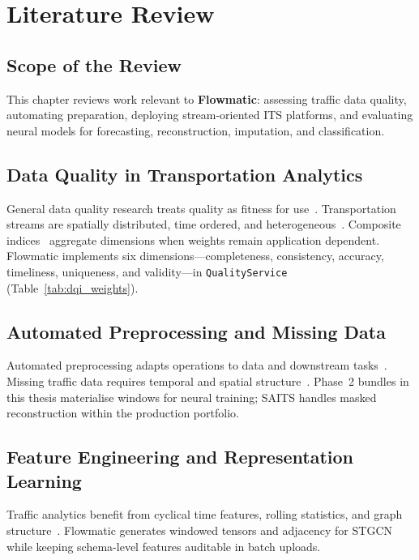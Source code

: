 \chapter{Literature Review}
\label{chap:literature}

\section{Scope of the Review}

This chapter reviews work relevant to \textbf{Flowmatic}: assessing traffic data quality, automating preparation, deploying stream-oriented ITS platforms, and evaluating neural models for forecasting, reconstruction, imputation, and classification.

\section{Data Quality in Transportation Analytics}

General data quality research treats quality as fitness for use~\cite{wang1996beyond,pipino2002data}. Transportation streams are spatially distributed, time ordered, and heterogeneous~\cite{rahm2000data,heinrich2007assessing}. Composite indices~\cite{bieberstein2006data} aggregate dimensions when weights remain application dependent. Flowmatic implements six dimensions---completeness, consistency, accuracy, timeliness, uniqueness, and validity---in \texttt{QualityService} (Table~\ref{tab:dqi_weights}).

\section{Automated Preprocessing and Missing Data}

Automated preprocessing adapts operations to data and downstream tasks~\cite{liu2022automated,sharma2022scenario,feurer2019auto}. Missing traffic data requires temporal and spatial structure~\cite{tang2024missing,chan2023missing}. Phase~2 bundles in this thesis materialise windows for neural training; SAITS handles masked reconstruction within the production portfolio.

\section{Feature Engineering and Representation Learning}

Traffic analytics benefit from cyclical time features, rolling statistics, and graph structure~\cite{cai2022feature,luo2024spatiotemporal,wu2021graph}. Flowmatic generates windowed tensors and adjacency for STGCN while keeping schema-level features auditable in batch uploads.

